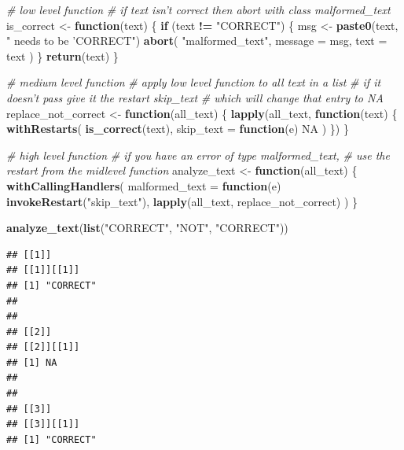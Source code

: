 \documentclass[]{book}
\newenvironment{Shaded}{\begin{snugshade}}{\end{snugshade}}
\newcommand{\CommentTok}[1]{\textcolor[rgb]{0.56,0.35,0.01}{\textit{#1}}}
\newcommand{\ControlFlowTok}[1]{\textcolor[rgb]{0.13,0.29,0.53}{\textbf{#1}}}
\newcommand{\DataTypeTok}[1]{\textcolor[rgb]{0.13,0.29,0.53}{#1}}
\newcommand{\KeywordTok}[1]{\textcolor[rgb]{0.13,0.29,0.53}{\textbf{#1}}}
\newcommand{\NormalTok}[1]{#1}
\newcommand{\OperatorTok}[1]{\textcolor[rgb]{0.81,0.36,0.00}{\textbf{#1}}}
\newcommand{\OtherTok}[1]{\textcolor[rgb]{0.56,0.35,0.01}{#1}}
\newcommand{\StringTok}[1]{\textcolor[rgb]{0.31,0.60,0.02}{#1}}
\begin{document}
\begin{Shaded}
\begin{Highlighting}[]
\CommentTok{# low level function}
\CommentTok{# if text isn't correct then abort with class malformed_text}
\NormalTok{is_correct <-}\StringTok{ }\ControlFlowTok{function}\NormalTok{(text) \{}
  \ControlFlowTok{if}\NormalTok{ (text }\OperatorTok{!=}\StringTok{ "CORRECT"}\NormalTok{) \{}
\NormalTok{    msg <-}\StringTok{ }\KeywordTok{paste0}\NormalTok{(text, }\StringTok{" needs to be 'CORRECT"}\NormalTok{)}
    \KeywordTok{abort}\NormalTok{(}
      \StringTok{"malformed_text"}\NormalTok{,}
      \DataTypeTok{message =}\NormalTok{ msg,}
      \DataTypeTok{text =}\NormalTok{ text}
\NormalTok{    )}
\NormalTok{  \}}
  \KeywordTok{return}\NormalTok{(text)}
\NormalTok{\}}

\CommentTok{# medium level function}
\CommentTok{# apply low level function to all text in a list}
\CommentTok{# if it doesn't pass give it the restart skip_text}
\CommentTok{# which will change that entry to NA}
\NormalTok{replace_not_correct <-}\StringTok{ }\ControlFlowTok{function}\NormalTok{(all_text) \{}
  \KeywordTok{lapply}\NormalTok{(all_text, }\ControlFlowTok{function}\NormalTok{(text) \{}
    \KeywordTok{withRestarts}\NormalTok{(}
      \KeywordTok{is_correct}\NormalTok{(text),}
      \DataTypeTok{skip_text =} \ControlFlowTok{function}\NormalTok{(e) }\OtherTok{NA}
\NormalTok{    )}
\NormalTok{  \})}
\NormalTok{\}}

\CommentTok{# high level function}
\CommentTok{# if you have an error of type malformed_text, }
\CommentTok{# use the restart from the midlevel function}
\NormalTok{analyze_text <-}\StringTok{ }\ControlFlowTok{function}\NormalTok{(all_text) \{}
  \KeywordTok{withCallingHandlers}\NormalTok{(}
    \DataTypeTok{malformed_text =} \ControlFlowTok{function}\NormalTok{(e) }\KeywordTok{invokeRestart}\NormalTok{(}\StringTok{"skip_text"}\NormalTok{),}
    \KeywordTok{lapply}\NormalTok{(all_text, replace_not_correct)}
\NormalTok{  )}
\NormalTok{\}}

\KeywordTok{analyze_text}\NormalTok{(}\KeywordTok{list}\NormalTok{(}\StringTok{"CORRECT"}\NormalTok{, }\StringTok{"NOT"}\NormalTok{, }\StringTok{"CORRECT"}\NormalTok{))}
\end{Highlighting}
\end{Shaded}

\begin{verbatim}
## [[1]]
## [[1]][[1]]
## [1] "CORRECT"
## 
## 
## [[2]]
## [[2]][[1]]
## [1] NA
## 
## 
## [[3]]
## [[3]][[1]]
## [1] "CORRECT"
\end{verbatim}
\end{document}
